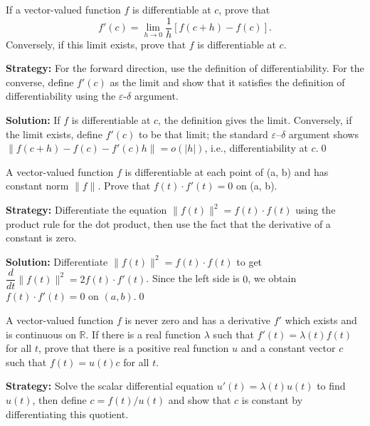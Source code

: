 \begin{problembox}
If a vector-valued function \( f \) is differentiable at \( c \), prove that
\[ f'(c) = \lim_{h \to 0} \frac{1}{h} [f(c + h) - f(c)]. \]
Conversely, if this limit exists, prove that \( f \) is differentiable at \( c \).
\end{problembox}

\noindent\textbf{Strategy:} For the forward direction, use the definition of differentiability. For the converse, define \( f'(c) \) as the limit and show that it satisfies the definition of differentiability using the \( \varepsilon \)-\( \delta \) argument.

\bigskip\noindent\textbf{Solution:}
If $f$ is differentiable at $c$, the definition gives the limit. Conversely, if the limit exists, define $f'(c)$ to be that limit; the standard $\varepsilon$–$\delta$ argument shows $\|f(c+h)-f(c)-f'(c)h\|=o(|h|)$, i.e., differentiability at $c$.\qed


\begin{problembox}
A vector-valued function \( f \) is differentiable at each point of (a, b) and has constant norm \( \|f\| \). Prove that \( f(t) \cdot f'(t) = 0 \) on (a, b).
\end{problembox}

\noindent\textbf{Strategy:} Differentiate the equation \( \|f(t)\|^2 = f(t) \cdot f(t) \) using the product rule for the dot product, then use the fact that the derivative of a constant is zero.

\bigskip\noindent\textbf{Solution:}
Differentiate $\|f(t)\|^2=f(t)\cdot f(t)$ to get $\dfrac{d}{dt}\|f(t)\|^2=2 f(t)\cdot f'(t)$. Since the left side is $0$, we obtain $f(t)\cdot f'(t)=0$ on $(a,b)$.\qed


\begin{problembox}
A vector-valued function \( f \) is never zero and has a derivative \( f' \) which exists and is continuous on \( \mathbb{R} \). If there is a real function \( \lambda \) such that \( f'(t) = \lambda(t)f(t) \) for all \( t \), prove that there is a positive real function \( u \) and a constant vector \( c \) such that \( f(t) = u(t)c \) for all \( t \).
\end{problembox}

\noindent\textbf{Strategy:} Solve the scalar differential equation \( u'(t) = \lambda(t)u(t) \) to find \( u(t) \), then define \( c = f(t)/u(t) \) and show that \( c \) is constant by differentiating this quotient.

